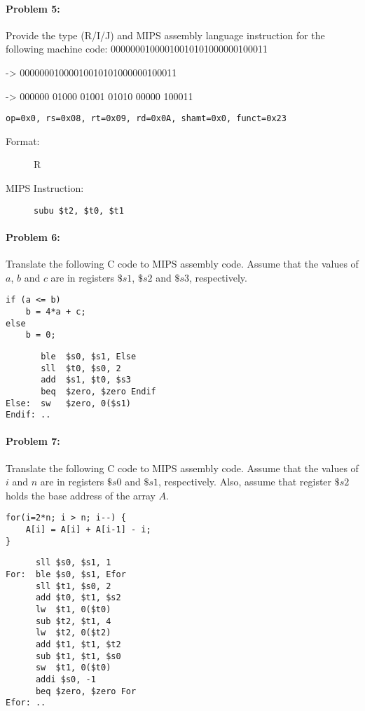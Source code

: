 \documentclass[12pt,letterpaper,titlepage]{article}
\begin{document}
\begin{raggedright}
\paragraph{Problem 5: }	
Provide the type (R/I/J) and MIPS assembly language instruction for the following machine code: 00000001000010010101000000100011

-> 00000001000010010101000000100011

-> 000000 01000 01001 01010 00000 100011

\begin{lstlisting}
op=0x0, rs=0x08, rt=0x09, rd=0x0A, shamt=0x0, funct=0x23
\end{lstlisting}
\begin{description}
\item[Format:] R
\item[MIPS Instruction:] 
\begin{lstlisting}
subu $t2, $t0, $t1
\end{lstlisting}
\end{description}

\paragraph{Problem 6: }
Translate the following C code to MIPS assembly code. Assume that the values of $a$, $b$ and $c$ are in registers $\$s1$, $\$s2$ and $\$s3$, respectively.
\begin{lstlisting}
if (a <= b)
	b = 4*a + c;
else
	b = 0;
\end{lstlisting}

\begin{lstlisting}
       ble  $s0, $s1, Else
       sll  $t0, $s0, 2
       add  $s1, $t0, $s3
       beq  $zero, $zero Endif
Else:  sw   $zero, 0($s1) 
Endif: ..
\end{lstlisting}

\paragraph{Problem 7: }
Translate the following C code to MIPS assembly code. Assume that the values of $i$ and $n$ are in registers $\$s0$ and $\$s1$, respectively. Also, assume that register $\$s2$ holds the base address of the array $A$.

\begin{lstlisting}
for(i=2*n; i > n; i--) {
	A[i] = A[i] + A[i-1] - i;
}
\end{lstlisting}

\begin{lstlisting}
      sll $s0, $s1, 1
For:  ble $s0, $s1, Efor
      sll $t1, $s0, 2
      add $t0, $t1, $s2
      lw  $t1, 0($t0)
      sub $t2, $t1, 4
      lw  $t2, 0($t2)
      add $t1, $t1, $t2
      sub $t1, $t1, $s0
      sw  $t1, 0($t0)
      addi $s0, -1
      beq $zero, $zero For
Efor: ..
\end{lstlisting}


\end{raggedright}
\end{document}
